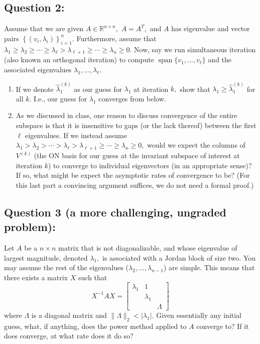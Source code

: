 \documentclass[11pt,onecolumn]{article}
\DeclareMathOperator{\vspan}{span}
\begin{document}
\subsection*{Question 2:}
Assume that we are given $A\in\mathbb{R}^{n\times n},$ $A=A^T,$ and $A$ has eigenvalue and vector pairs $\left\{(v_i,\lambda_i)\right\}_{i=1}^n.$ Furthermore, assume that $\lambda_1 \geq \lambda_2 \geq \cdots \geq \lambda_\ell > \lambda_{\ell+1}\geq \cdots \geq \lambda_n \geq 0.$ Now, say we run simultaneous iteration (also known an orthogonal iteration) to compute $\vspan\{v_1,\ldots,v_\ell\}$ and the associated eigenvalues $\lambda_1,\ldots,\lambda_\ell.$

\begin{enumerate}[label=(\alph*)]
    \item If we denote $\hat{\lambda}_1^{(k)}$ as our guess for $\lambda_1$ at iteration $k,$ show that $\lambda_1 \geq \hat{\lambda}_1^{(k)}$ for all $k.$ I.e., our guess for $\lambda_1$ converges from below.
    \item As we discussed in class, one reason to discuss convergence of the entire subspace is that it is insensitive to gaps (or the lack thereof) between the first $\ell$ eigenvalues. If we instead assume $\lambda_1 > \lambda_2 > \cdots > \lambda_\ell > \lambda_{\ell+1}\geq \cdots \geq \lambda_n \geq 0,$ would we expect the columns of $V^{(k)}$ (the ON basis for our guess at the invariant subspace of interest at iteration $k$) to converge to individual eigenvectors (in an appropriate sense)? If so, what might be expect the asymptotic rates of convergence to be? (For this last part a convincing argument suffices, we do not need a formal proof.)
\end{enumerate}

\subsection*{Question 3 (a more challenging, ungraded problem):}
Let $A$ be a $n\times n$ matrix that is not diagonalizable, and whose eigenvalue of largest magnitude, denoted $\lambda_1,$ is associated with a Jordan block of size two. You may assume the rest of the eigenvalues ($\lambda_2,\ldots,\lambda_{n-1}$) are simple. This means that there exists a matrix $X$ such that 
\[
    X^{-1}AX = \begin{bmatrix}\lambda_1 & 1 & \\ & \lambda_1 & \\ & & \Lambda \end{bmatrix}
\]
where $\Lambda$ is a diagonal matrix and $\|\Lambda\|_2<\lvert \lambda_1\rvert.$ Given essentially any initial guess, what, if anything, does the power method applied to $A$ converge to? If it does converge, at what rate does it do so? 
\end{document}
